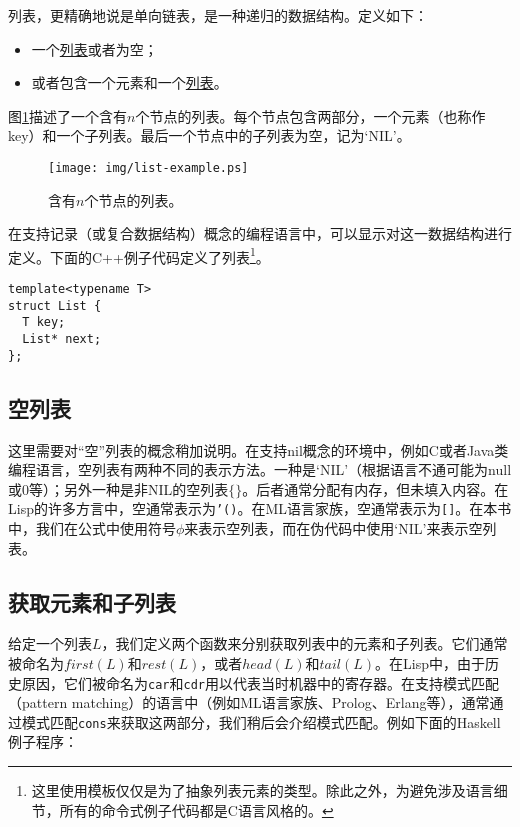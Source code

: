 \documentclass[UTF8]{article}
\begin{document}
列表，更精确地说是单向链表，是一种递归的数据结构。定义如下：

\begin{itemize}
\item 一个\underline{列表}或者为空；
\item 或者包含一个元素和一个\underline{列表}。
\end{itemize}

图\ref{fig:list-example}描述了一个含有$n$个节点的列表。每个节点包含两部分，一个元素（也称作key）和一个子列表。最后一个节点中的子列表为空，记为‘NIL’。

\begin{figure}[htbp]
  \centering
  \texttt{[image: img/list-example.ps]}
  \caption{含有$n$个节点的列表。} \label{fig:list-example}
\end{figure}

在支持记录（或复合数据结构）概念的编程语言中，可以显示对这一数据结构进行定义。下面的C++例子代码定义了列表\footnote{这里使用模板仅仅是为了抽象列表元素的类型。除此之外，为避免涉及语言细节，所有的命令式例子代码都是C语言风格的。}。

\lstset{language=C++}
\begin{lstlisting}
template<typename T>
struct List {
  T key;
  List* next;
};
\end{lstlisting}

\subsection{空列表}

这里需要对“空”列表的概念稍加说明。在支持nil概念的环境中，例如C或者Java类编程语言，空列表有两种不同的表示方法。一种是‘NIL’（根据语言不通可能为null或0等）；另外一种是非NIL的空列表$\{ \}$。后者通常分配有内存，但未填入内容。在Lisp的许多方言中，空通常表示为\texttt{'()}。在ML语言家族，空通常表示为\texttt{[]}。在本书中，我们在公式中使用符号$\phi$来表示空列表，而在伪代码中使用‘NIL’来表示空列表。

\subsection{获取元素和子列表}

给定一个列表$L$，我们定义两个函数来分别获取列表中的元素和子列表。它们通常被命名为$first(L)$和$rest(L)$，或者$head(L)$和$tail(L)$。在Lisp中，由于历史原因，它们被命名为\texttt{car}和\texttt{cdr}用以代表当时机器中的寄存器\cite{SICP}。在支持模式匹配（pattern matching）的语言中（例如ML语言家族、Prolog、Erlang等），通常通过模式匹配\texttt{cons}来获取这两部分，我们稍后会介绍模式匹配。例如下面的Haskell例子程序：
\end{document}
